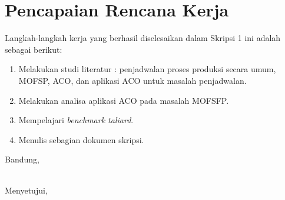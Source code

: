 \documentclass[a4paper,twoside]{article}
\begin{document}
\section{Pencapaian Rencana Kerja}
Langkah-langkah kerja yang berhasil diselesaikan dalam Skripsi 1 ini adalah sebagai berikut:
\begin{enumerate}
\item Melakukan studi literatur : penjadwalan proses produksi secara umum, MOFSP, ACO, dan aplikasi ACO untuk masalah penjadwalan.
\item Melakukan analisa aplikasi ACO pada masalah MOFSFP.
\item Mempelajari {\it benchmark taliard}.
\item Menulis sebagian dokumen skripsi.
\end{enumerate}




\newpage
\vspace{1cm}
\centering Bandung, \tanggal\\
\vspace{2cm} \nama \\ 
\vspace{1cm}

Menyetujui, \\
\end{document}

